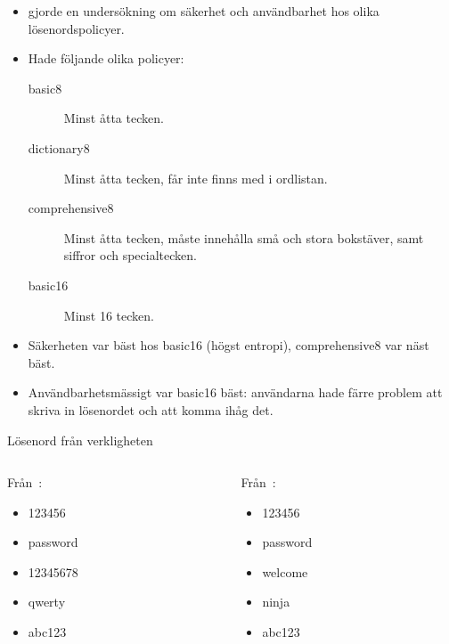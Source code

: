 \documentclass{beamer}
\begin{document}
\begin{frame}{\insertsubsectionhead}
  \begin{itemize}
    \item \citet{Komanduri2011opa} gjorde en undersökning om säkerhet och 
      användbarhet hos olika lösenordspolicyer.

    \item Hade följande olika policyer:
      \begin{description}
        \item[basic8] Minst åtta tecken.

        \item[dictionary8] Minst åtta tecken, får inte finns med i ordlistan.

        \item[comprehensive8] Minst åtta tecken, måste innehålla små och stora 
          bokstäver, samt siffror och specialtecken.

        \item[basic16] Minst 16 tecken.
      \end{description}

    \item Säkerheten var bäst hos basic16 (högst entropi), comprehensive8 var 
      näst bäst.

    \item Användbarhetsmässigt var basic16 bäst: användarna hade färre problem 
      att skriva in lösenordet och att komma ihåg det.
  \end{itemize}
\end{frame}

\begin{frame}{\insertsubsectionhead}{Lösenord från verkligheten}
  \begin{columns}
    \begin{column}{0.5\textwidth}
      Från~\cite{Oberheide2010bao}:
      \begin{itemize}
        \item 123456
        \item password
        \item 12345678
        \item qwerty
        \item abc123
      \end{itemize}
    \end{column}
    \begin{column}{0.5\textwidth}
      Från~\cite{Cluley2012twp}:
      \begin{itemize}
        \item 123456
        \item password
        \item welcome
        \item ninja
        \item abc123
      \end{itemize}
    \end{column}
  \end{columns}
\end{frame}
\end{document}
